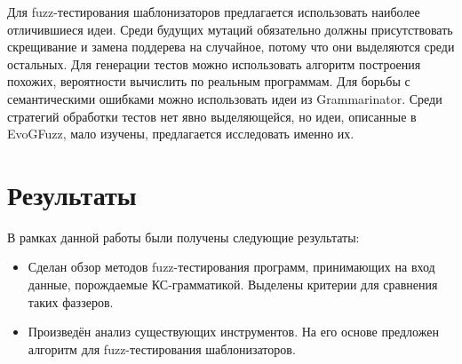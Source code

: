 \documentclass[a4paper]{article}
\begin{document}
Для fuzz-тестирования шаблонизаторов предлагается использовать наиболее отличившиеся идеи. Среди будущих мутаций обязательно должны присутствовать скрещивание и замена поддерева на случайное, потому что они выделяются среди остальных. Для генерации тестов можно использовать алгоритм построения похожих, вероятности вычислить по реальным программам. Для борьбы с семантическими ошибками можно использовать идеи из Grammarinator. Среди стратегий обработки тестов нет явно выделяющейся, но идеи, описанные в EvoGFuzz, мало изучены, предлагается исследовать именно их.

\newpage
\section{Результаты}
\indent

В рамках данной работы были получены следующие результаты:
\begin{itemize}
    \item Сделан обзор методов fuzz-тестирования программ, принимающих на вход данные, порождаемые КС-грамматикой. Выделены критерии для сравнения таких фаззеров.
    \item Произведён анализ существующих инструментов. На его основе предложен алгоритм для fuzz-тестирования шаблонизаторов.
\end{itemize}

\newpage
\end{document}
